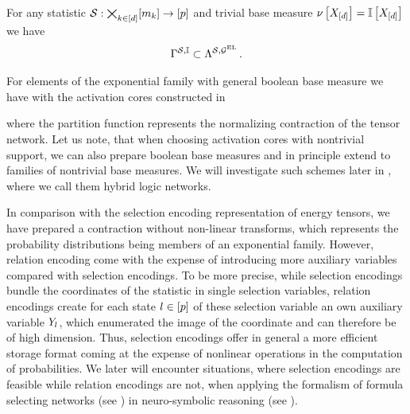 \begin{corollary}
    \label{cor:unaryActivationExpdistRealization}
    For any statistic $\mathcal{S}:\bigtimes_{k\in[d]}[m_{k}]\rightarrow[p]$ and trivial base measure $\nu\left[X_{[d]}\right]=\mathbb{I}\left[X_{[d]}\right]$ we have
    \begin{align*}
        \Gamma^{\mathcal{S},\mathbb{I}} \subset \Lambda^{\mathcal{S},\mathcal{G}^{\mathrm{EL}}} \, .
    \end{align*}
\end{corollary}

For elements of the exponential family with general boolean base measure we have with the activation cores constructed in 
\begin{center}
    
\end{center}
where the partition function represents the normalizing contraction of the tensor network.
Let us note, that when choosing activation cores with nontrivial support, we can also prepare boolean base measures and in principle extend  to families of nontrivial base measures.
We will investigate such schemes later in , where we call them hybrid logic networks.

In comparison with the selection encoding representation of energy tensors, we have prepared a contraction without non-linear transforms, which represents the probability distributions being members of an exponential family.
However, relation encoding come with the expense of introducing more auxiliary variables compared with selection encodings.
To be more precise, while selection encodings bundle the coordinates of the statistic in single selection variables, relation encodings create for each state $l\in[p]$ of these selection variable an own auxiliary variable $Y_{l}$, which enumerated the image of the coordinate and can therefore be of high dimension.
Thus, selection encodings offer in general a more efficient storage format coming at the expense of nonlinear operations in the computation of probabilities.
We later will encounter situations, where selection encodings are feasible while relation encodings are not, when applying the formalism of formula selecting networks (see ) in neuro-symbolic reasoning (see ).


